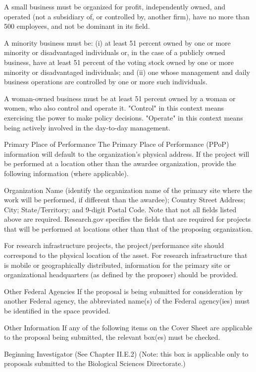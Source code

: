 {A small business must be organized for profit, independently owned, and operated (not a subsidiary of, or controlled by, another firm), have no more than 500 employees, and not be dominant in its field.

A minority business must be: (i) at least 51 percent owned by one or more minority or disadvantaged individuals or, in the case of a publicly owned business, have at least 51 percent of the voting stock owned by one or more minority or disadvantaged individuals; and (ii) one whose management and daily business operations are controlled by one or more such individuals.

A woman-owned business must be at least 51 percent owned by a woman or women, who also control and operate it. "Control" in this context means exercising the power to make policy decisions. "Operate" in this context means being actively involved in the day-to-day management.

Primary Place of Performance
The Primary Place of Performance (PPoP) information will default to the organization’s physical address. If the project will be performed at a location other than the awardee organization, provide the following information (where applicable).

Organization Name (identify the organization name of the primary site where the work will be performed, if different than the awardee);
Country
Street Address;
City;
State/Territory; and
9-digit Postal Code.
Note that not all fields listed above are required. Research.gov specifies the fields that are required for projects that will be performed at locations other than that of the proposing organization.

For research infrastructure projects, the project/performance site should correspond to the physical location of the asset. For research infrastructure that is mobile or geographically distributed, information for the primary site or organizational headquarters (as defined by the proposer) should be provided.

Other Federal Agencies
If the proposal is being submitted for consideration by another Federal agency, the abbreviated name(s) of the Federal agency(ies) must be identified in the space provided.

Other Information
If any of the following items on the Cover Sheet are applicable to the proposal being submitted, the relevant box(es) must be checked.

Beginning Investigator (See Chapter II.E.2) (Note: this box is applicable only to proposals submitted to the Biological Sciences Directorate.)

}
